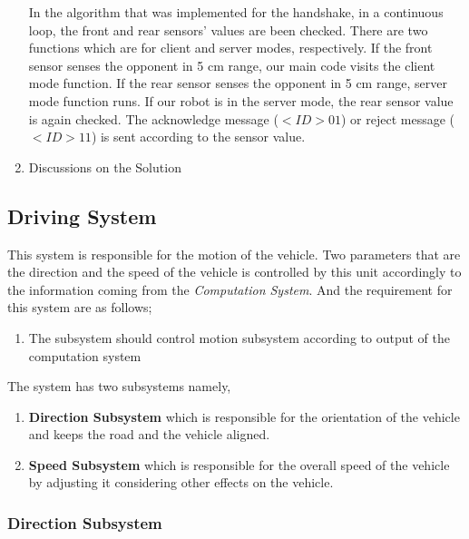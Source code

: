 \documentclass[a4paper,12pt]{article}
\begin{document}
\begin{enumerate}
	In the algorithm that was implemented for the handshake, in a continuous loop, the front and rear sensors' values are been checked. There are two functions which are for client and server modes, respectively. If the front sensor senses the opponent in 5 cm range, our main code visits the client mode function. If the rear sensor senses the opponent in 5 cm range, server mode function runs. If our robot is in the server mode, the rear sensor value is again checked. The acknowledge message ($< ID> 01$) or reject message ($< ID> 11$) is sent according to the sensor value.
	
			
			\item {Discussions on the Solution}
			
		\end{enumerate}
	
	
	
	\subsection{Driving System}
	
	This system is responsible for the motion of the vehicle. Two parameters that are the direction and the speed of the vehicle is controlled by this unit accordingly to the information coming from the \textit{Computation System}. And the requirement for this system are as follows;
		
		\begin{enumerate}
			\item The subsystem should control motion subsystem according to output of the computation system			
		\end{enumerate}
		
		
		The system has two subsystems namely,
		
			\begin{enumerate}
				\item \textbf{Direction Subsystem} which is responsible for the orientation of the vehicle and keeps the road and the vehicle aligned.
				\item \textbf{Speed Subsystem} which is responsible for the overall speed of the vehicle by adjusting it considering other effects on the vehicle.
			\end{enumerate}
			
	\subsubsection{Direction Subsystem}
		
\end{document}
